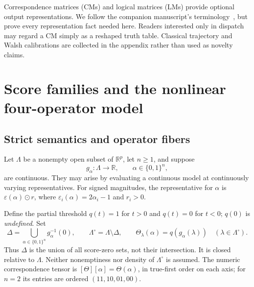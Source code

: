 \documentclass[11pt]{article}
\theoremstyle{definition}
\theoremstyle{remark}
\newcommand{\R}{\mathbb R}
\newcommand{\B}{\{0,1\}}
\newcommand{\eps}{\varepsilon}
\newcommand{\CM}[1]{[#1]}
\begin{document}
Correspondence matrices (CMs) and logical matrices (LMs) provide optional output representations. We follow the companion manuscript's terminology~\cite{Theory2026}, but prove every representation fact needed here. Readers interested only in dispatch may regard a CM simply as a reshaped truth table. Classical trajectory and Walsh calibrations are collected in the appendix rather than used as novelty claims.

\section{Score families and the nonlinear four-operator model}\label{sec:model}

\subsection{Strict semantics and operator fibers}
Let $\Lambda$ be a nonempty open subset of $\R^p$, let $n\ge1$, and suppose
\[
 g_\alpha:\Lambda\longrightarrow\R,\qquad \alpha\in\B^n,
\]
are continuous. They may arise by evaluating a continuous model at continuously varying representatives. For signed magnitudes, the representative for $\alpha$ is $\eps(\alpha)\odot r$, where $\eps_i(\alpha)=2\alpha_i-1$ and $r_i>0$.

Define the partial threshold $q(t)=1$ for $t>0$ and $q(t)=0$ for $t<0$; $q(0)$ is \emph{undefined}. Set
\[
 \Delta=\bigcup_{\alpha\in\B^n}g_\alpha^{-1}(0),\qquad
 \Lambda^\circ=\Lambda\setminus\Delta,\qquad
 \Theta_\lambda(\alpha)=q(g_\alpha(\lambda))\quad(\lambda\in\Lambda^\circ).
\]
Thus $\Delta$ is the union of all score-zero sets, not their intersection. It is closed relative to $\Lambda$. Neither nonemptiness nor density of $\Lambda^\circ$ is assumed. The numeric correspondence tensor is $\CM{\Theta}[\alpha]=\Theta(\alpha)$, in true-first order on each axis; for $n=2$ its entries are ordered $(11,10,01,00)$.
\end{document}
